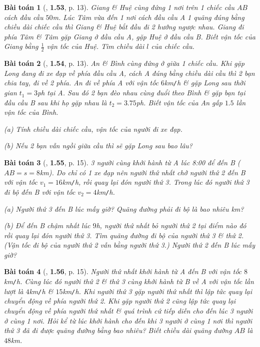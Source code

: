 \documentclass{article}
\numberwithin{equation}{section}
\newtheorem{baitoan}{Bài toán}[section]
\begin{document}
\begin{baitoan}[\cite{Van2022}, \textbf{1.53}, p. 13]
	Giang \& Huệ cùng đứng 1 nơi trên 1 chiếc cầu $AB$ cách đầu cầu $50$\emph{m}. Lúc Tâm vừa đến 1 nơi cách đầu cầu A 1 quãng đúng bằng chiều dài chiếc cầu thì Giang \& Huệ bắt đầu đi 2 hướng ngược nhau. Giang đi phía Tâm \& Tâm gặp Giang ở đầu cầu A, gặp Huệ ở đầu cầu B. Biết vận tốc của Giang bằng $\frac{1}{2}$ vận tốc của Huệ. Tìm chiều dài $l$ của chiếc cầu.
\end{baitoan}

\begin{baitoan}[\cite{Van2022}, \textbf{1.54}, p. 13]
	An \& Bình cùng đứng ở giữa 1 chiếc cầu. Khi gặp Long đang đi xe đạp về phía đầu cầu A, cách A đúng bằng chiều dài cầu thì 2 bạn chia tay, đi về 2 phía. An đi về phía A với vận tốc $6$\emph{km\texttt{/}h} \& gặp Long sau thời gian $t_1 = 3$\emph{ph} tại A. Sau đó 2 bạn đèo nhau cùng đuổi theo Bình \& gặp bạn tại đầu cầu B sau khi họ gặp nhau là $t_2 = 3.75$\emph{ph}. Biết vận tốc của An gấp $1.5$ lần vận tốc của Bình.
	\begin{enumerate*}
		\item[(a)] Tính chiều dài chiếc cầu, vận tốc của người đi xe đạp.
		\item[(b)] Nếu 2 bạn vẫn ngồi giữa cầu thì sẽ gặp Long sau bao lâu?
	\end{enumerate*}
\end{baitoan}

\begin{baitoan}[\cite{Van2022}, \textbf{1.55}, p. 15]
	3 người cùng khởi hành từ A lúc 8:00 để đến B ($AB = s = 8$\emph{km}). Do chỉ có 1 xe đạp nên người thứ nhất chở người thứ 2 đến B với vận tốc $v_1 = 16$\emph{km\texttt{/}h}, rồi quay lại đón người thứ 3. Trong lúc đó người thứ 3 đi bộ đến B với vận tốc $v_2 = 4$\emph{km\texttt{/}h}.
	\begin{enumerate*}
		\item[(a)] Người thứ 3 đến B lúc mấy giờ? Quãng đường phải đi bộ là bao nhiêu \emph{km}?
		\item[(b)] Để đến B chậm nhất lúc $9$\emph{h}, người thứ nhất bỏ người thứ 2 tại điểm nào đó rồi quay lại đón người thứ 3. Tìm quãng đường đi bộ của người thứ 3 \& thứ 2. (Vận tốc đi bộ của người thứ 2 vẫn bằng người thứ 3.) Người thứ 2 đến B lúc mấy giờ?
	\end{enumerate*}
\end{baitoan}

\begin{baitoan}[\cite{Van2022}, \textbf{1.56}, p. 15]
	Người thứ nhất khởi hành từ A đến B với vận tốc $8$\emph{km\texttt{/}h}. Cùng lúc đó người thứ 2 \& thứ 3 cùng khởi hành từ B về A với vận tốc lần lượt là $4$\emph{km\texttt{/}h} \& $15$\emph{km\texttt{/}h}. Khi người thứ 3 gặp người thứ nhất thì lập tức quay lại chuyển động về phía người thứ 2. Khi gặp người thứ 2 cũng lập tức quay lại chuyển động về phía người thứ nhất \& quá trình cứ tiếp diễn cho đến lúc 3 người ở cùng 1 nơi. Hỏi kể từ lúc khởi hành cho đến khi 3 người ở cùng 1 nơi thì người thứ 3 đã đi được quãng đường bằng bao nhiêu? Biết chiều dài quãng đường $AB$ là $48$\emph{km}.
\end{baitoan}
\end{document}
